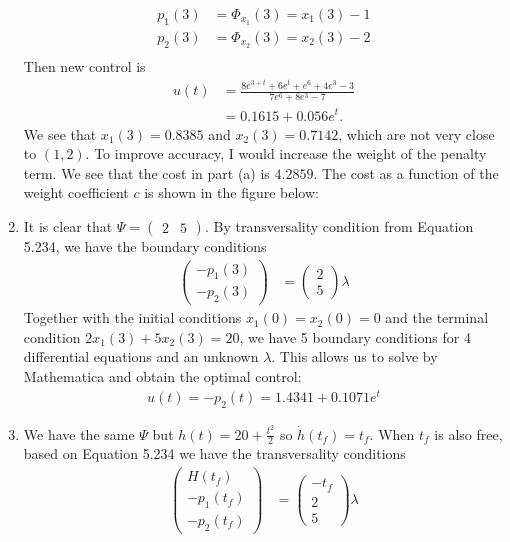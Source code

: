\documentclass[12pt]{article}
\begin{document}
\begin{problem}[1]
\begin{enumerate}[label=(\alph*)]
\begin{align*}
	p_1(3) &= \Phi_{x_1}(3) = x_1(3)-1 \\
	p_2(3) &= \Phi_{x_2}(3) = x_2(3)-2 \\
\end{align*}
Then new control is
\begin{align*}
	u(t) &= \frac{8e^{3+t}+6e^{t}+e^{6}+4e^3-3}{7e^{6}+8e^3-7}\\
	&= 0.1615+0.056 e^{t} .
\end{align*}
We see that $ x_1(3) = 0.8385$ and $ x_2(3) = 0.7142$, which are not very close to $ (1,2)$. To improve accuracy, I would increase the weight of the penalty term. We see that the cost in part (a) is  $ 4.2859$. The cost as a function of the weight coefficient  $ c$ is shown in the figure below:


\item It is clear that $ \Psi = \begin{pmatrix} 2&5 \end{pmatrix} $. By transversality condition from Equation 5.234, we have the boundary conditions
\begin{align*}
	\begin{pmatrix} -p_1(3)\\-p_2(3) \end{pmatrix} &= \begin{pmatrix} 2\\5 \end{pmatrix} \lambda 
\end{align*}
Together with the initial conditions $ x_1(0)=x_2(0)=0$ and the terminal condition $ 2 x_1(3) + 5x_2(3) = 20$, we have 5 boundary conditions for 4 differential equations and an unknown $ \lambda$. This allows us to solve by Mathematica and obtain the optimal control:
\begin{align*}
	u(t)=-p_2(t)= 1.4341+0.1071 e^{t}
\end{align*}
\item We have the same $\Psi $ but $ h(t) = 20 +\frac{t^2}{ 2}$ so $ \dot{h}(t_f) = t_f$. When $ t_f$ is also free, based on Equation 5.234 we have the transversality conditions
\begin{align*}
	\begin{pmatrix} H(t_f)\\ -p_1(t_f)\\-p_2(t_f) \end{pmatrix} &= \begin{pmatrix} -t_f\\ 2\\5 \end{pmatrix} \lambda 

\end{align*}
\end{enumerate}
\end{problem}
\end{document}
